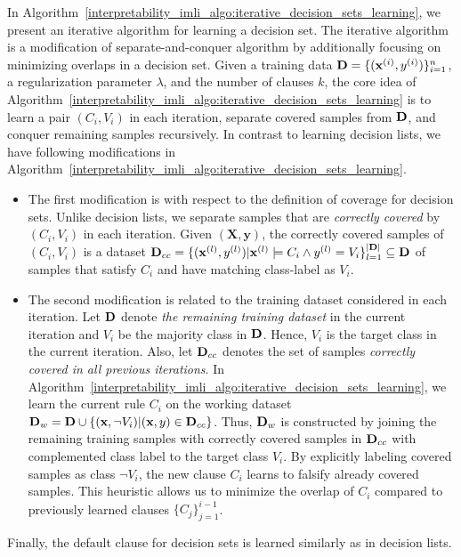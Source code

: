 In Algorithm~\ref{interpretability_imli_algo:iterative_decision_sets_learning}, we present an iterative algorithm for learning a decision set. The iterative algorithm is a modification of separate-and-conquer algorithm  by additionally focusing on minimizing overlaps in a decision set.  Given a training data $ \mathbf{D} = \{(\mathbf{x}^{(i)}, y^{(i)})\}_{i=1}^n $, a  regularization parameter $ \lambda $, and the number of clauses $ k $, the core idea of Algorithm~\ref{interpretability_imli_algo:iterative_decision_sets_learning} is to learn a pair $ (C_i,V_i) $ in each iteration, separate covered samples from $ \mathbf{D} $, and conquer remaining samples recursively. In contrast to learning decision lists, we have following modifications in Algorithm~\ref{interpretability_imli_algo:iterative_decision_sets_learning}. 

\begin{itemize}
	\item The first modification is with respect to the definition of coverage for decision sets. Unlike decision lists, we separate samples that are \textit{correctly covered} by $ (C_i, V_i) $ in each iteration. Given  $ (\mathbf{X}, \mathbf{y}) $, the correctly covered samples of $ (C_i, V_i) $ is a dataset $ \mathbf{D}_{cc}  =  \{(\mathbf{x}^{(l)}, y^{(l)}) | \mathbf{x}^{(l)} \models C_i \wedge y^{(l)} = V_i \}_{l=1}^{|\mathbf{D}|} \subseteq \mathbf{D} $ of samples that satisfy $ C_i $ and have matching class-label as $ V_i $. 
	\item The second modification is related to the  training dataset considered in each iteration. Let $ \mathbf{D} $ denote \emph{the remaining training dataset} in the current iteration and $ V_i $ be the majority class in  $ \mathbf{D} $. Hence, $ V_i $ is the target class in the current iteration. Also, let $ \mathbf{D}_{cc} $ denotes the set of samples \emph{correctly covered in all previous iterations}. In Algorithm~\ref{interpretability_imli_algo:iterative_decision_sets_learning}, we learn the current rule $ C_i $ on the working dataset $ \mathbf{D}_{w} = \mathbf{D}  \cup \{(\mathbf{x}, \neg V_i) | (\mathbf{x}, y) \in \mathbf{D}_{cc}\} $. Thus, $ \mathbf{D}_{w} $ is constructed by joining the remaining training samples with correctly covered samples in $ \mathbf{D}_{cc} $ with complemented class label to the target class $ V_i $.  By explicitly labeling covered samples as class $ \neg V_i $, the new clause $ C_i $ learns to falsify already covered samples. This heuristic allows us to minimize the overlap of $ C_i $ compared to previously learned clauses $ \{C_j\}_{j=1}^{i-1} $.
\end{itemize}

Finally, the default clause for decision sets is learned similarly as in decision lists. 





\newcommand{\maxsatquery}{\ensuremath{\mathsf{ConstructQuery}}}
\newcommand{\createclause}{\ensuremath{\mathsf{ConstructClause}}}
\newcommand{\iterativeClauseLearning}{\ensuremath{\mathsf{IterativeClauseLearning}}}
\let\oldReturn\Return
\renewcommand{\Return}{\State\oldReturn}